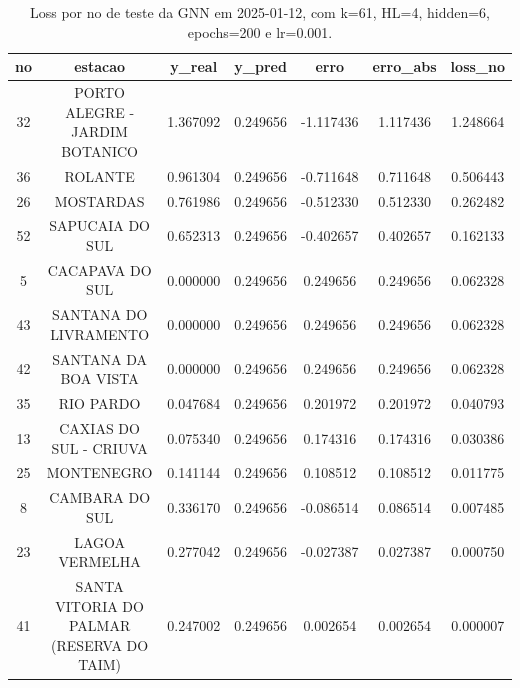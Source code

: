 \begin{table}[h]
\centering
\caption{Loss por no de teste da GNN em 2025-01-12, com k=61, HL=4, hidden=6, epochs=200 e lr=0.001.}
\label{tab:gnn_loss_k61_hl4_h6_e200_d20250112}
\begin{tabular}{ccccccc}
\toprule
no & estacao & y\_real & y\_pred & erro & erro\_abs & loss\_no \\
\midrule
32 & PORTO ALEGRE - JARDIM BOTANICO & 1.367092 & 0.249656 & -1.117436 & 1.117436 & 1.248664 \\
36 & ROLANTE & 0.961304 & 0.249656 & -0.711648 & 0.711648 & 0.506443 \\
26 & MOSTARDAS & 0.761986 & 0.249656 & -0.512330 & 0.512330 & 0.262482 \\
52 & SAPUCAIA DO SUL & 0.652313 & 0.249656 & -0.402657 & 0.402657 & 0.162133 \\
5 & CACAPAVA DO SUL & 0.000000 & 0.249656 & 0.249656 & 0.249656 & 0.062328 \\
43 & SANTANA DO LIVRAMENTO & 0.000000 & 0.249656 & 0.249656 & 0.249656 & 0.062328 \\
42 & SANTANA DA BOA VISTA & 0.000000 & 0.249656 & 0.249656 & 0.249656 & 0.062328 \\
35 & RIO PARDO & 0.047684 & 0.249656 & 0.201972 & 0.201972 & 0.040793 \\
13 & CAXIAS DO SUL - CRIUVA & 0.075340 & 0.249656 & 0.174316 & 0.174316 & 0.030386 \\
25 & MONTENEGRO & 0.141144 & 0.249656 & 0.108512 & 0.108512 & 0.011775 \\
8 & CAMBARA DO SUL & 0.336170 & 0.249656 & -0.086514 & 0.086514 & 0.007485 \\
23 & LAGOA VERMELHA & 0.277042 & 0.249656 & -0.027387 & 0.027387 & 0.000750 \\
41 & SANTA VITORIA DO PALMAR (RESERVA DO TAIM) & 0.247002 & 0.249656 & 0.002654 & 0.002654 & 0.000007 \\
\bottomrule
\end{tabular}
\end{table}
